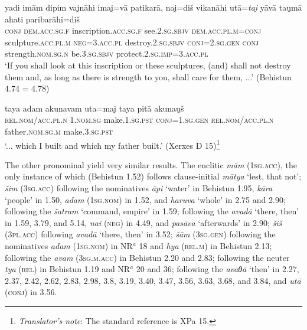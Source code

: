 \begin{exe}
\ex
\gll yadi imām dipim vai̯nāhi imai̯=vā patikarā, nai̯=diš vikanāhi utā=\emph{tai̯} yāvā tau̯mā ahati paribarāhi=diš\\
\textsc{conj} \textsc{dem.acc.sg.f} inscription.\textsc{acc.sg.f} see.\textsc{2.sg.sbjv} \textsc{dem.acc.pl.m}=\textsc{conj} sculpture.\textsc{acc.pl.m} \textsc{neg}=\textsc{3.acc.pl} destroy.\textsc{2.sg.sbjv} \textsc{conj}=\textsc{2.sg.gen} \textsc{conj} strength.\textsc{nom.sg.n} be.\textsc{3.sg.sbjv} protect.\textsc{2.sg.imp}=\textsc{3.acc.pl}\\
\trans `If you shall look at this inscription or these sculptures, (and) shall not destroy them and, as long as there is strength to you, shall care for them, ...' (Behistun 4.74 = 4.78)
\label{behistun474}
\end{exe}

\begin{exe}
\ex
\gll taya adam akunavam uta=mai̯ taya pitā akunau̯š\\
\textsc{rel.nom/acc.pl.n} \textsc{1.nom.sg} make.\textsc{1.sg.pst} \textsc{conj}=\textsc{1.sg.gen} \textsc{rel.nom/acc.pl.n} father.\textsc{nom.sg.m} make.\textsc{3.sg.pst}\\
\trans `... which I built and which my father built.' (Xerxes D 15)\footnote{\emph{Translator's note}: The standard reference is XPa 15.}
\label{xerxesd15}
\end{exe}

The other pronominal  yield very similar results.  {The enclitic} \emph{mām} (\textsc{1sg.acc}), the only instance of which (Behistun 1.52) follows clause-initial \emph{mātya} `lest, that not'; \emph{šim} (\textsc{3sg.acc}) following the nominatives \emph{āpi} `water' in Behistun 1.95, \emph{kāra} `people' in 1.50, \emph{adam} (\textsc{1sg.nom}) in 1.52, and \emph{haruva} `whole' in 2.75 and 2.90; following the  \emph{šatram} `command, empire' in 1.59; following the  \emph{avadā} `there, then' in 1.59, 3.79, and 5.14, \emph{nai} (\textsc{neg}) in 4.49, and \emph{pasāva} `afterwards' in 2.90; \emph{šiš} (\textsc{3pl.acc}) following \emph{avadā} `there, then' in 3.52; \emph{šām} (\textsc{3sg.gen}) following the nominatives \emph{adam} (\textsc{1sg.nom}) in NR$^a$ 18 and \emph{hya} (\textsc{rel.m}) in Behistun 2.13; following the  \emph{avam} (\textsc{3sg.m.acc}) in Behistun 2.20 and 2.83; following the neuter \emph{tya} (\textsc{rel}) in Behistun 1.19 and NR$^a$ 20 and 36; following the  \emph{avaθā} `then' in 2.27, 2.37, 2.42, 2.62, 2.83, 2.98, 3.8, 3.19, 3.40, 3.47, 3.56, 3.63, 3.68, and 3.84, and \emph{utā} (\textsc{conj}) in 3.56.

